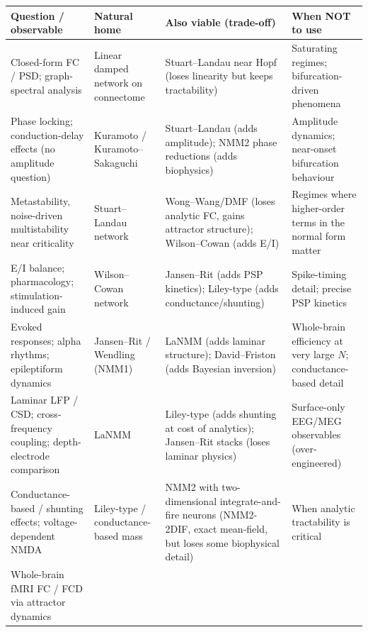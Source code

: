 \documentclass[12pt]{article}
\numberwithin{equation}{section}
\begin{document}
\begin{table}[!htbp]
\centering
\begingroup
{}
\setlength{\arrayrulewidth}{0.4pt}
\renewcommand{\arraystretch}{1.3}
\footnotesize
{}
\begin{tabularx}{\textwidth}{|p{3.2cm}|p{3.0cm}|Y|p{3.0cm}|}
\hline
{}
\textbf{\color{softblue!60!black} Question / observable} &
\textbf{\color{softblue!60!black} Natural home} &
\textbf{\color{softblue!60!black} Also viable (trade-off)} &
\textbf{\color{softblue!60!black} When NOT to use} \\
\hline
Closed-form FC / PSD; graph-spectral analysis
  & Linear damped network on connectome
  & Stuart--Landau near Hopf (loses linearity but keeps tractability)
  & Saturating regimes; bifurcation-driven phenomena \\[3pt]
Phase locking; conduction-delay effects (no amplitude question)
  & Kuramoto / Kuramoto--Sakaguchi
  & Stuart--Landau (adds amplitude); NMM2 phase reductions (adds biophysics)
  & Amplitude dynamics; near-onset bifurcation behaviour \\[3pt]
Metastability, noise-driven multistability near criticality
  & Stuart--Landau network
  & Wong--Wang/DMF (loses analytic FC, gains attractor structure); Wilson--Cowan (adds E/I)
  & Regimes where higher-order terms in the normal form matter \\[3pt]
E/I balance; pharmacology; stimulation-induced gain
  & Wilson--Cowan network
  & Jansen--Rit (adds PSP kinetics); Liley-type (adds conductance/shunting)
  & Spike-timing detail; precise PSP kinetics \\[3pt]
Evoked responses; alpha rhythms; epileptiform dynamics
  & Jansen--Rit / Wendling (NMM1)
  & LaNMM (adds laminar structure); David--Friston (adds Bayesian inversion)
  & Whole-brain efficiency at very large $N$; conductance-based detail \\[3pt]
Laminar LFP / CSD; cross-frequency coupling; depth-electrode comparison
  & LaNMM
  & Liley-type (adds shunting at cost of analytics); Jansen--Rit stacks (loses laminar physics)
  & Surface-only EEG/MEG observables (over-engineered) \\[3pt]
Conductance-based / shunting effects; voltage-dependent NMDA
  & Liley-type / conductance-based mass
  & NMM2 with two-dimensional integrate-and-fire neurons (NMM2-2DIF, exact mean-field, but loses some biophysical detail)
  & When analytic tractability is critical \\[3pt]
Whole-brain fMRI FC / FCD via attractor dynamics

\end{tabularx}
\end{table}
\end{document}
